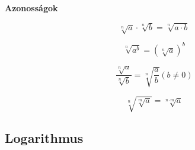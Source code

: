 \begin{tcolorbox}
	\begin{center}
		\bf\huge{Azonosságok}
	\end{center}
	\begin{minipage}{0.49\textwidth}
		\begin{tcolorbox}[width=\textwidth,center]
			$$\sqrt[n]{a}\cdot\sqrt[n]{b}=\sqrt[n]{a\cdot b}$$
		\end{tcolorbox}
		\begin{tcolorbox}[width=\textwidth,center]
			$$\sqrt[n]{a^b} = \left(\sqrt[n]{a}\right)^b$$
		\end{tcolorbox}
	\end{minipage}
	\hfill
	\begin{minipage}{0.49\textwidth}
		\begin{tcolorbox}[width=\textwidth,center]
			$$\frac{\sqrt[n]{a}}{\sqrt[n]{b}} = \sqrt[n]{\frac{a}{b}} (b\neq 0)$$
		\end{tcolorbox}
		\begin{tcolorbox}[width=\textwidth,center]
			$$\sqrt[n]{\sqrt[m]{a}} = \sqrt[n\cdot m]{a}$$
		\end{tcolorbox}
	\end{minipage}
\end{tcolorbox}


\newpage
\subsection{Logarithmus}


